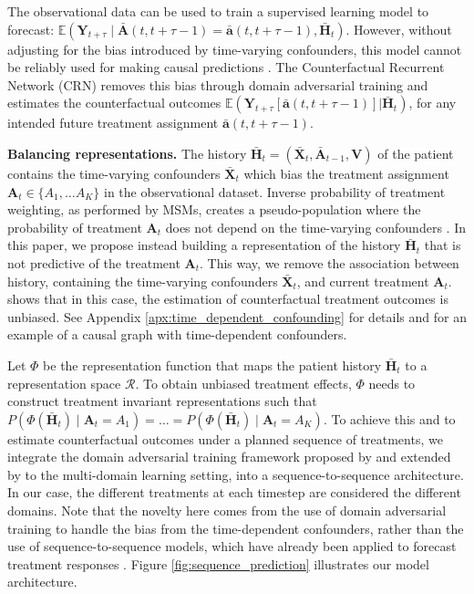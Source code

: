 \documentclass{article} %
\newcommand{\vc}[1]{\mathbf{#1}}
\newcommand{\cl}[1]{\mathcal{#1}}
\newcommand{\hist}[1]{\bar{\vc{#1}}}
\begin{document}
		The observational data can be used to train a supervised learning model to forecast: $\mathbb{E}(\vc{Y}_{t+\tau}\mid \hist{A}(t, t+\tau -1 ) =  \hist{a}(t, t+\tau -1 ), \bar{\vc{H}}_{t})$. However, without adjusting for the bias introduced by time-varying confounders, this model cannot be reliably used for making causal predictions \citep{robins2000marginal, robins2008estimation, schulam2017reliable}. The Counterfactual Recurrent Network (CRN) removes this bias through domain adversarial training and estimates the counterfactual outcomes $\mathbb{E}(\vc{Y}_{t+\tau}[\hist{a}(t, t+\tau -1 )] | \bar{\vc{H}}_{t})$,
		for any intended future treatment assignment $\hist{a}(t, t+\tau -1 )$.

		\textbf{Balancing representations.}  The history $\bar{\vc{H}}_{t} = (\bar{\vc{X}}_{t}, \bar{\vc{A}}_{t-1}, \vc{V}) $ of the patient contains the time-varying confounders $\hist{X}_t$ which bias the treatment assignment $\vc{A}_t \in \{ A_{1}, \dots A_{K} \}$  in the observational dataset. Inverse probability of treatment weighting, as performed by MSMs, creates a pseudo-population where the probability of treatment $\vc{A}_t$ does not depend on the time-varying confounders \citep{robins2000marginal}.  In this paper, we propose instead building a representation of the history $\bar{\vc{H}}_{t}$ that is not predictive of the treatment $\vc{A}_t$. This way, we remove the association between history, containing the time-varying confounders $\hist{X}_t$, and current treatment $\vc{A}_t$. \cite{robins1999association} shows that in this case, the estimation of counterfactual treatment outcomes is unbiased. See Appendix \ref{apx:time_dependent_confounding} for details and for an example of a causal graph with time-dependent confounders. 

		
		Let $\Phi$ be the representation function that maps the patient history  $\bar{\vc{H}}_{t}$ to a representation space $ \cl{R}$. To obtain unbiased treatment effects, $\Phi$ needs to construct treatment invariant representations such that $P(\Phi(\hist{H}_t)\mid \vc{A}_t =  A_{1}) = \dots = P( \Phi(\hist{H}_t)\mid \vc{A}_t = A_{K})$. To achieve this and to estimate counterfactual outcomes under a planned sequence of treatments, we integrate the domain adversarial training framework proposed by \citet{ganin2016domain} and extended by \citet{sebag2019multi} to the multi-domain learning setting, into a sequence-to-sequence architecture. In our case, the different treatments at each timestep are considered the different domains. Note that the novelty here comes from the use of domain adversarial training to handle the bias from the time-dependent confounders, rather than the use of sequence-to-sequence models, which have already been applied to forecast treatment responses \citep{lim2018forecasting}. Figure \ref{fig:sequence_prediction} illustrates our model architecture.
		
\end{document}
